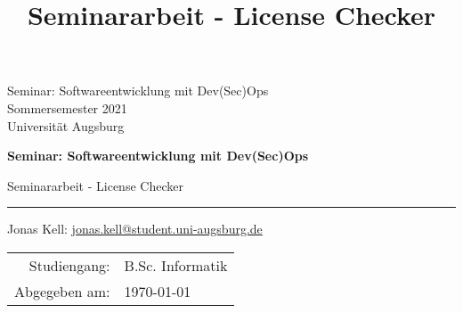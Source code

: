 \newcommand{\authorI}{Jonas Kell}
\newcommand{\mailI}{jonas.kell@student.uni-augsburg.de}

\newcommand{\veranstaltung}{Seminar: Softwareentwicklung mit Dev(Sec)Ops}
\newcommand{\papertitle}{Seminararbeit - License Checker}

\title{\papertitle}
\author{\authorname}


\begin{titlepage}
\color{darkgray}
\veranstaltung \\
Sommersemester 2021\\
Universität Augsburg\\

\color{black}



\begin{center}
    \vspace*{3cm}
    
    \Huge
    \textbf{\veranstaltung}
    
    \vspace{0.5cm}
    \huge
    \papertitle %
    
    \vspace{0.5cm}
    \hrule height 0.07cm 
    \vspace{0.5cm}
    \fontsize{15}{30}\selectfont

    \authorI: \href{mailto:\mailI}{\mailI}
\end{center}

\vfill

\noindent
\fontsize{12}{30}\selectfont
\renewcommand*{\arraystretch}{1.2}
\Large
\begin{center}
    \begin{tabular}{rl}
        Studiengang: &B.Sc. Informatik\\
        Abgegeben am: &\today
    \end{tabular}
\end{center}
\renewcommand*{\arraystretch}{1.5}
\end{titlepage}
